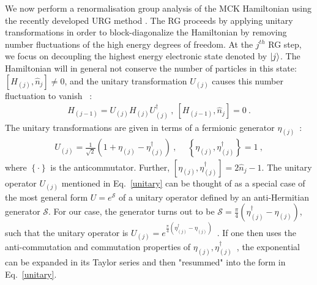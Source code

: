\documentclass[reprint,prb,superscriptaddress]{revtex4-2}
\begin{document}
We now perform a renormalisation group analysis of the MCK Hamiltonian using the recently developed URG method \cite{anirbanmott1,anirbanmott2,anirbanurg1,anirbanurg2,siddharthacpi,santanukagome,1dhubjhep}.
The RG proceeds {by applying unitary transformations in order to block-diagonalize the Hamiltonian by removing number fluctuations of the high energy degrees of freedom}.
At the $j^{th}$ RG step, we focus on decoupling the highest energy electronic state denoted by $\ket{j}$.
The Hamiltonian will in general not conserve the number of particles in this state: \(\left[H_{(j)}, \hat n_{j}\right] \neq 0\), and the unitary transformation \(U_{(j)}\) causes this number fluctuation to vanish
~\cite{anirbanurg1,anirbanurg2}:
\begin{equation}\begin{aligned}
	H_{(j-1)} = U_{(j)} H_{(j)} U^\dagger_{(j)}~, ~\left[H_{(j-1)}, \hat n_{j}\right] =0~.
\end{aligned}\end{equation}
The unitary transformations are given in terms of a fermionic generator \(\eta_{(j)}\)~\cite{anirbanurg1,anirbanurg2}:
\begin{equation}\begin{aligned}
	\label{unitary}
	U_{(j)} = \frac{1}{\sqrt 2}\left(1 + \eta_{(j)} - \eta_{(j)}^\dagger\right)~,~ \quad\left\{ \eta_{(j)},\eta_{(j)}^\dagger \right\} = 1~,
\end{aligned}\end{equation}
where \(\left\{\cdot\right\}\) is the anticommutator. {\color{blue} Further, $\left[ \eta_{(j)},\eta_{(j)}^\dagger \right] = 2\hat n_{j}-1$. The unitary operator \(U_{(j)}\) mentioned in Eq.~\eqref{unitary} can be thought of as a special case of the most general form \(U = e^\mathcal{S}\) of a unitary operator defined by an anti-Hermitian generator \(\mathcal{S}\). For our case, the generator turns out to be \(\mathcal{S} = \frac{\pi}{4}\left( \eta^\dagger_{(j)} - \eta_{(j)} \right) \), such that the unitary operator is \(U_{(j)} = e^{\frac{\pi}{4}\left(\eta^\dagger_{(j)} - \eta_{(j)}\right) }\)~\cite{anirbanurg1}. If one then uses the anti-commutation and commutation properties of \(\eta_{(j)},\eta^\dagger_{(j)}\)~\cite{anirbanurg1,anirbanurg2}, the exponential can be expanded in its Taylor series and then "resummed" into the form in Eq.~\eqref{unitary}.}
\end{document}
